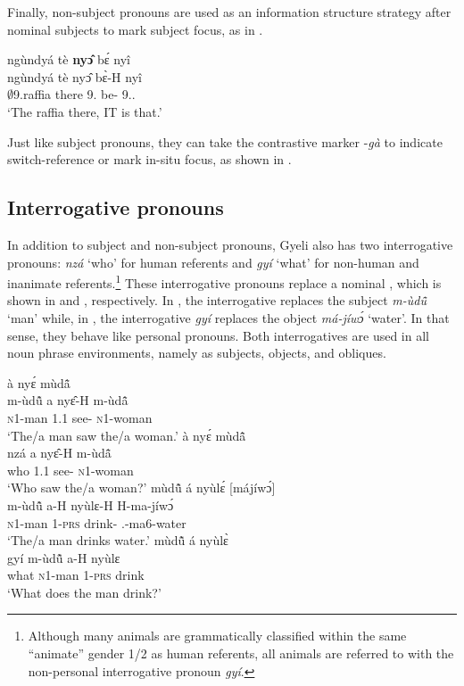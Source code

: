 Finally, non-subject pronouns are used as an information structure strategy after nominal subjects to mark subject focus, as in . 

\ea \label{beEMPH2x}
  \glll   ngùndyá tè {\bfseries nyɔ̂} bɛ́ nyî \\
          ngùndyá tè nyɔ̂ bɛ̀-H nyî \\
           $\emptyset$9.raffia there 9.{\OBJ} be-{\R} 9.{\DEM}.{\PROX}  \\
    \trans `The raffia there, IT is that.'
\z

Just like subject pronouns, they can take the contrastive marker -{\itshape gà} to indicate switch-reference or mark in-situ focus, as shown in . 


\subsection{Interrogative pronouns}
\label{sec:INTERRPRO}

In addition to subject and non-subject pronouns, Gyeli also has two interrogative pronouns: {\itshape nzá} `who' for human referents and {\itshape gyí} `what' for non-human and inanimate referents.\footnote{Although many animals are grammatically classified within the same ``animate'' gender 1/2 as human referents, all animals are referred to with the non-personal interrogative pronoun {\itshape gyí}.}
These interrogative pronouns replace a nominal {\NP}, which is shown in  and , respectively. In , the interrogative replaces the subject {\NP} {\itshape m-ùdũ̂} `man' while, in , the interrogative {\itshape gyí} replaces the object {\NP} {\itshape má-jíwɔ́} `water'. In that sense, they behave like personal pronouns. Both interrogatives are used in all noun phrase environments, namely as subjects, objects, and obliques.

\ea \label{nza}
  \ea  \label{nza1}
  \glll     [mùdũ̂] à nyɛ́ mùdã̂ \\
              {\db}m-ùdũ̂ a nyɛ̂-H m-ùdã̂\\
    {\db}\textsc{n}1-man 1.{\PST}1 see-{\R} \textsc{n}1-woman \\
    \trans `The/a man saw the/a woman.'
\ex\label{nza2}
   à nyɛ́ mùdã̂  \\
           nzá  a nyɛ̂-H m-ùdã̂ \\
          who 1.{\PST}1 see-{\R} \textsc{n}1-woman \\
    \trans `Who saw the/a woman?'
\z
\ex \label{gyi}
  \ea  \label{gyi1}
  \glll     mùdũ̂ á nyùlɛ́ [májíwɔ́] \\
             m-ùdũ̂ a-H nyùlɛ-H {\db}H-ma-jíwɔ́ \\
              \textsc{n}1-man 1-\textsc{prs} drink-{\R} {\db}{\OBJ}.{\LINK}-ma6-water \\
    \trans `The/a man drinks water.'
\ex\label{gyi2}
  mùdũ̂ á nyùlɛ̀  \\
           gyí m-ùdũ̂ a-H nyùlɛ \\
             what \textsc{n}1-man 1-\textsc{prs} drink \\
    \trans `What does the man drink?'
\z
\z

